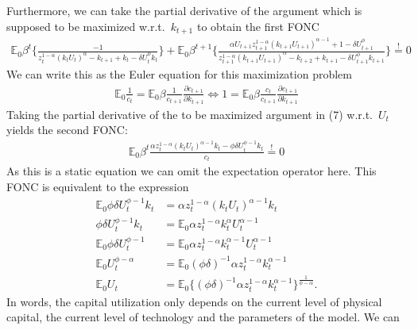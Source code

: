 \documentclass[a4paper]{article}
\theoremstyle{definition}
\begin{document}
Furthermore, we can take the partial derivative of the argument which is supposed to be maximized w.r.t.\ $k_{t+1}$ to obtain the first FONC
	\begin{align*}
	\mathbb E_0 \beta^t \Big\{ \frac{-1}{z_t^{1-\alpha}(k_t U_t)^\alpha - k_{t+1} + k_t - \delta U_t^\phi k_t} \Big\} + \mathbb E_0 \beta^{t+1} \Big\{ \frac{\alpha U_{t+1} z_{t+1}^{1-\alpha}(k_{t+1}U_{t+1})^{\alpha-1} + 1 - \delta U_{t+1}^\phi}{z_{t+1}^{1-\alpha}(k_{t+1}U_{t+1})^\alpha-k_{t+2}+k_{t+1}-\delta U_{t+1}^\phi k_{t+1}} \Big\} \overset{!}{=} 0 
	\end{align*}
We can write this as the Euler equation for this maximization problem
	\begin{align*}
	\mathbb E_0 \frac{1}{c_t} = \mathbb E_0 \beta \frac{1}{c_{t+1}} \frac{\partial c_{t+1}}{\partial k_{t+1}} \Leftrightarrow 1 = \mathbb E_0 \beta \frac{c_{t}}{c_{t+1}} \frac{\partial c_{t+1}}{\partial k_{t+1}}
	\end{align*}
Taking the partial derivative of the to be maximized argument in (7) w.r.t.\ $U_t$ yields the second FONC:
	\begin{align*}
	\mathbb E_0 \beta^t \frac{\alpha z_t^{1-\alpha}(k_t U_t)^{\alpha-1}k_t- \phi \delta U_t^{\phi-1}k_t}{c_t} \overset{!}{=} 0
	\end{align*}
As this is a static equation we can omit the expectation operator here. This FONC is equivalent to the expression
	\begin{align*}
	\mathbb E_0 \phi \delta U_t^{\phi-1}k_t 	&= \alpha z_t^{1-\alpha}(k_t U_t)^{\alpha-1}k_t \\
	\phi \delta U_t^{\phi-1}k_t 	&= \mathbb E_0 \alpha z_t^{1-\alpha} k_t^{\alpha}U_t^{\alpha-1} \\
	\mathbb E_0 \phi \delta U_t^{\phi-1} 		&=\mathbb E_0 \alpha z_t^{1-\alpha} k_t^{\alpha-1} U_t^{\alpha-1} \\
	\mathbb E_0 U_t^{\phi-\alpha} 				&=\mathbb E_0  (\phi \delta)^{-1}  \alpha z_t^{1-\alpha} k_t^{\alpha-1} \\
	\mathbb E_0 U_t 								&=\mathbb E_0  \Big\{ (\phi \delta)^{-1}  \alpha z_t^{1-\alpha} k_t^{\alpha-1} \Big\}^{\frac{1}{\phi-\alpha}}.
	\end{align*}
In words, the capital utilization only depends on the current level of physical capital, the current level of technology and the parameters of the model. We can 
\end{document}
